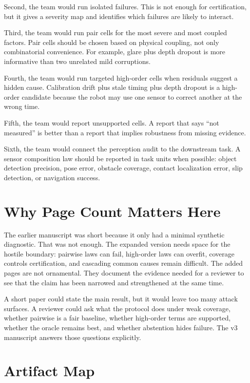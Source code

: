 \documentclass{article}
\begin{document}
Second, the team would run isolated failures. This is not enough for certification, but it gives a severity map and identifies which failures are likely to interact.

Third, the team would run pair cells for the most severe and most coupled factors. Pair cells should be chosen based on physical coupling, not only combinatorial convenience. For example, glare plus depth dropout is more informative than two unrelated mild corruptions.

Fourth, the team would run targeted high-order cells when residuals suggest a hidden cause. Calibration drift plus stale timing plus depth dropout is a high-order candidate because the robot may use one sensor to correct another at the wrong time.

Fifth, the team would report unsupported cells. A report that says ``not measured'' is better than a report that implies robustness from missing evidence.

Sixth, the team would connect the perception audit to the downstream task. A sensor composition law should be reported in task units when possible: object detection precision, pose error, obstacle coverage, contact localization error, slip detection, or navigation success.

\section{Why Page Count Matters Here}

The earlier manuscript was short because it only had a minimal synthetic diagnostic. That was not enough. The expanded version needs space for the hostile boundary: pairwise laws can fail, high-order laws can overfit, coverage controls certification, and cascading common causes remain difficult. The added pages are not ornamental. They document the evidence needed for a reviewer to see that the claim has been narrowed and strengthened at the same time.

A short paper could state the main result, but it would leave too many attack surfaces. A reviewer could ask what the protocol does under weak coverage, whether pairwise is a fair baseline, whether high-order terms are supported, whether the oracle remains best, and whether abstention hides failure. The v3 manuscript answers those questions explicitly.

\section{Artifact Map}
\end{document}
